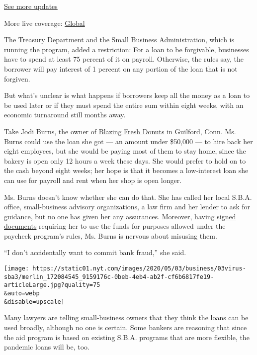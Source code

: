\href{https://www.nytimes.com/live/2020/08/17/business/stock-market-today-coronavirus?action=click\&pgtype=Article\&state=default\&region=MAIN_CONTENT_1\&context=storylines_live_updates}{See
more updates}

More live coverage:
\href{https://www.nytimes.com/2020/08/17/world/coronavirus-covid.html?action=click\&pgtype=Article\&state=default\&region=MAIN_CONTENT_1\&context=storylines_live_updates}{Global}

The Treasury Department and the Small Business Administration, which is
running the program, added a restriction: For a loan to be forgivable,
businesses have to spend at least 75 percent of it on payroll.
Otherwise, the rules say, the borrower will pay interest of 1 percent on
any portion of the loan that is not forgiven.

But what's unclear is what happens if borrowers keep all the money as a
loan to be used later or if they must spend the entire sum within eight
weeks, with an economic turnaround still months away.

Take Jodi Burns, the owner of
\href{https://www.blazingfreshdonuts.com/}{Blazing Fresh Donuts} in
Guilford, Conn. Ms. Burns could use the loan she got --- an amount under
\$50,000 --- to hire back her eight employees, but she would be paying
most of them to stay home, since the bakery is open only 12 hours a week
these days. She would prefer to hold on to the cash beyond eight weeks;
her hope is that it becomes a low-interest loan she can use for payroll
and rent when her shop is open longer.

Ms. Burns doesn't know whether she can do that. She has called her local
S.B.A. office, small-business advisory organizations, a law firm and her
lender to ask for guidance, but no one has given her any assurances.
Moreover, having
\href{https://home.treasury.gov/system/files/136/PPP-Borrower-Application-Form-Fillable.pdf}{signed
documents} requiring her to use the funds for purposes allowed under the
paycheck program's rules, Ms. Burns is nervous about misusing them.

``I don't accidentally want to commit bank fraud,'' she said.

\texttt{[image: https://static01.nyt.com/images/2020/05/03/business/03virus-sba3/merlin\_172084545\_9159176c-0beb-4eb4-ab2f-cf6b6817fe19-articleLarge.jpg?quality=75\\\&auto=webp\\\&disable=upscale]}

Many lawyers are telling small-business owners that they think the loans
can be used broadly, although no one is certain. Some bankers are
reasoning that since the aid program is based on existing S.B.A.
programs that are more flexible, the pandemic loans will be, too.


